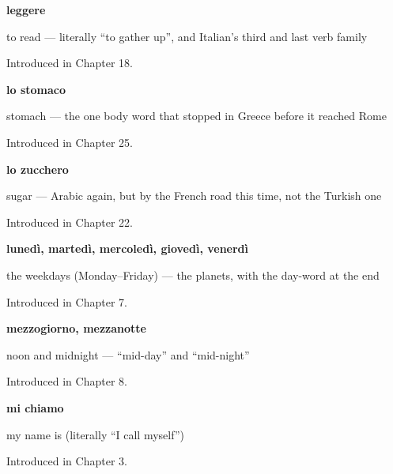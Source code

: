 \noindent\begin{minipage}[t]{\linewidth}
\raggedright
\textbf{leggere}\par
\small to read — literally \textquotedblleft{}to gather up\textquotedblright{}, and Italian's third and last verb family\par
\footnotesize Introduced in Chapter 18.
\end{minipage}\par\medskip

\noindent\begin{minipage}[t]{\linewidth}
\raggedright
\textbf{lo stomaco}\par
\small stomach — the one body word that stopped in Greece before it reached Rome\par
\footnotesize Introduced in Chapter 25.
\end{minipage}\par\medskip

\noindent\begin{minipage}[t]{\linewidth}
\raggedright
\textbf{lo zucchero}\par
\small sugar — Arabic again, but by the French road this time, not the Turkish one\par
\footnotesize Introduced in Chapter 22.
\end{minipage}\par\medskip

\noindent\begin{minipage}[t]{\linewidth}
\raggedright
\textbf{lunedì, martedì, mercoledì, giovedì, venerdì}\par
\small the weekdays (Monday–Friday) — the planets, with the day-word at the end\par
\footnotesize Introduced in Chapter 7.
\end{minipage}\par\medskip

\noindent\begin{minipage}[t]{\linewidth}
\raggedright
\textbf{mezzogiorno, mezzanotte}\par
\small noon and midnight — \textquotedblleft{}mid-day\textquotedblright{} and \textquotedblleft{}mid-night\textquotedblright{}\par
\footnotesize Introduced in Chapter 8.
\end{minipage}\par\medskip

\noindent\begin{minipage}[t]{\linewidth}
\raggedright
\textbf{mi chiamo}\par
\small my name is (literally \textquotedblleft{}I call myself\textquotedblright{})\par
\footnotesize Introduced in Chapter 3.
\end{minipage}\par\medskip

